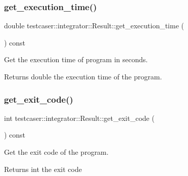 \subsubsection{\texorpdfstring{get\+\_\+execution\+\_\+time()}{get\_execution\_time()}}
{\footnotesize\ttfamily double testcaser\+::integrator\+::\+Result\+::get\+\_\+execution\+\_\+time (\begin{DoxyParamCaption}{ }\end{DoxyParamCaption}) const\hspace{0.3cm}{\ttfamily [inline]}}



Get the execution time of program in seconds. 

\begin{DoxyReturn}{Returns}
double the execution time of the program. 
\end{DoxyReturn}
\mbox{\label{classtestcaser_1_1integrator_1_1Result_a0795d3307ac8c3186288020bc75b3767}} 
\subsubsection{\texorpdfstring{get\+\_\+exit\+\_\+code()}{get\_exit\_code()}}
{\footnotesize\ttfamily int testcaser\+::integrator\+::\+Result\+::get\+\_\+exit\+\_\+code (\begin{DoxyParamCaption}{ }\end{DoxyParamCaption}) const\hspace{0.3cm}{\ttfamily [inline]}}



Get the exit code of the program. 

\begin{DoxyReturn}{Returns}
int the exit code 
\end{DoxyReturn}
\mbox{\label{classtestcaser_1_1integrator_1_1Result_aadd7237340243c5506d1fbf23f30e9d5}} 
